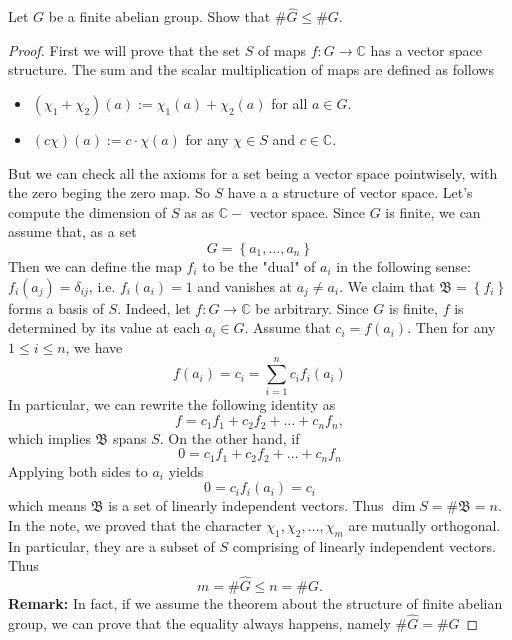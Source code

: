 \documentclass[11pt,letterpaper]{article}
\DeclareMathOperator{\1}{\mathbbm{1}}
\begin{document}
\begin{exercise}\label{ex2}
  Let $G$ be a finite abelian group. Show that $\#\hat{G} \le \#G$.
\end{exercise}
\begin{proof}
  First we will prove that the set $S$ of maps $f\colon G \to \mathbb{C}$ has a vector space structure.
  The sum and the scalar multiplication of maps are defined as follows
  \begin{itemize}
    \item $(\chi_1 + \chi_2)(a) := \chi_1(a)+ \chi_2(a)$ for all $a \in G$.
    \item $(c\chi)(a):= c\cdot\chi(a)$ for any $\chi \in S$ and $c \in \mathbb{C}$.
  \end{itemize}
  But we can check all the axioms for a set being a vector space pointwisely, with the zero
  beging the zero map. So $S$ have a a structure of vector space. Let's compute the dimension of $S$ as
  as $\mathbb{C}-$ vector space. Since $G$ is finite, we can assume that, as a set
  \[G = \left\lbrace a_1,\ldots,a_n \right\rbrace\]
  Then we can define the map $f_i$ to be the "dual" of $a_i$ in the following sense: $f_i(a_j) =\delta_{ij}$, i.e.
  $f_i(a_i)=1$ and vanishes at $a_j \ne a_i$. We claim that $\mathfrak{B}= \left\lbrace f_i \right\rbrace$ forms a basis of $S$.
  Indeed, let $f\colon G \to \mathbb{C}$ be arbitrary. Since $G$ is finite, $f$ is determined by its value at each $a_i \in G$.
  Assume that $c_i = f(a_i)$. Then for any $1 \le i \le n$, we have
  \[f(a_i) = c_i = \sum_{i=1}^n c_i f_i(a_i)\]
  In particular, we can rewrite the following identity as
  \[f = c_1f_1+c_2f_2+\ldots+c_nf_n,\]
  which implies $\mathfrak{B}$ spans $S$. On the other hand, if
  \[0 = c_1f_1+c_2f_2+\ldots+c_nf_n\]
  Applying both sides to $a_i$ yields
  \[0 = c_if_i(a_i) = c_i\]
  which means $\mathfrak{B}$ is a set of linearly independent vectors. Thus $\dim S = \#\mathfrak{B} = n$.
  In the note, we proved that the character $\chi_1,\chi_2,\ldots,\chi_m$ are mutually orthogonal. In particular, they are
  a subset of $S$ comprising of linearly independent vectors. Thus
  \[m = \#\hat{G} \le n = \# G. \]
  \textbf{Remark:} In fact, if we assume the theorem about the structure of finite abelian group, we can prove that
  the equality always happens, namely $ \#\hat{G} =\# G$
\end{proof}
\newpage
\end{document}
